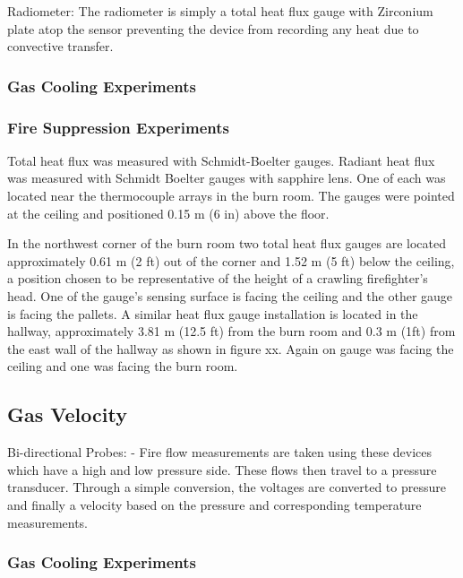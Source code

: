 \documentclass[12pt,oneside]{book}
\begin{document}
Radiometer:
The radiometer is simply a total heat flux gauge with Zirconium plate atop the sensor preventing the device from recording any heat due to convective transfer.


\subsubsection{Gas Cooling Experiments}
\label{subsubsec:Gas_Cooling_Heat_Flux_Instrumentation}

\subsubsection{Fire Suppression Experiments}
\label{subsubsec:Fire_Suppression_Heat_Flux_Instrumentation}

Total heat flux was measured with Schmidt-Boelter gauges.  Radiant heat flux was measured with Schmidt Boelter gauges with sapphire lens.  One of each was located near the thermocouple arrays in the burn room.  The gauges were pointed at the ceiling and positioned 0.15 m (6 in) above the floor.  

In the northwest corner of the burn room two total heat flux gauges are located approximately 0.61 m (2 ft) out of the corner and 1.52 m (5 ft) below the ceiling, a position chosen to be representative of the height of a crawling firefighter's head.  One of the gauge's sensing surface is facing the ceiling and the other gauge is facing the pallets.  A similar heat flux gauge installation is located in the hallway, approximately 3.81 m (12.5 ft) from the burn room and 0.3 m (1ft) from the east wall of the hallway as shown in figure xx.  Again on gauge was facing the ceiling and one was facing the burn room.  

\subsection{Gas Velocity}
\label{subsec:Gas_Velocity}

Bi-directional Probes:
- Fire flow measurements are taken using these devices which have a high and low pressure side.  These flows then travel to a pressure transducer.  Through a simple conversion, the voltages are converted to pressure and finally a velocity based on the pressure and corresponding temperature measurements.

\subsubsection{Gas Cooling Experiments}
\label{subsubsec:Gas_Cooling_Gas_Velocity_Instrumentation}
\end{document}

